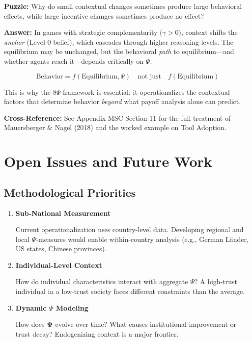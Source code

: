 \textbf{Puzzle:} Why do small contextual changes sometimes produce large behavioral effects,
while large incentive changes sometimes produce no effect?

\textbf{Answer:} In games with strategic complementarity ($\gamma > 0$), context shifts
the \textit{anchor} (Level-0 belief), which cascades through higher reasoning levels.
The equilibrium may be unchanged, but the behavioral \textit{path} to equilibrium---and
whether agents reach it---depends critically on $\Psi$.

\begin{equation}
\text{Behavior} = f(\text{Equilibrium}, \Psi) \quad \text{not just} \quad f(\text{Equilibrium})
\tag{V-DESIGN}
\end{equation}

This is why the 8$\Psi$ framework is essential: it operationalizes the contextual factors
that determine behavior \textit{beyond} what payoff analysis alone can predict.

\textbf{Cross-Reference:} See Appendix MSC Section 11 for the full treatment of
Mauersberger \& Nagel (2018) and the worked example on Tool Adoption.


\section{Open Issues and Future Work}
\label{sec:V-open}

\subsection{Methodological Priorities}

\begin{enumerate}
    \item \textbf{Sub-National Measurement}
    
    Current operationalization uses country-level data. Developing regional 
    and local $\Psi$-measures would enable within-country analysis (e.g., 
    German Länder, US states, Chinese provinces).
    
    \item \textbf{Individual-Level Context}
    
    How do individual characteristics interact with aggregate $\Psi$? 
    A high-trust individual in a low-trust society faces different constraints 
    than the average.
    
    \item \textbf{Dynamic $\Psi$ Modeling}
    
    How does $\boldsymbol{\Psi}$ evolve over time? What causes institutional 
    improvement or trust decay? Endogenizing context is a major frontier.
\end{enumerate}

